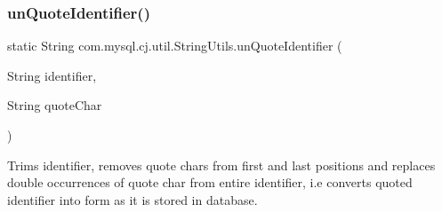 \subsubsection{\texorpdfstring{un\+Quote\+Identifier()}{unQuoteIdentifier()}}
{\footnotesize\ttfamily static String com.\+mysql.\+cj.\+util.\+String\+Utils.\+un\+Quote\+Identifier (\begin{DoxyParamCaption}\item[{String}]{identifier,  }\item[{String}]{quote\+Char }\end{DoxyParamCaption})\hspace{0.3cm}{\ttfamily [static]}}

Trims identifier, removes quote chars from first and last positions and replaces double occurrences of quote char from entire identifier, i.\+e converts quoted identifier into form as it is stored in database.


